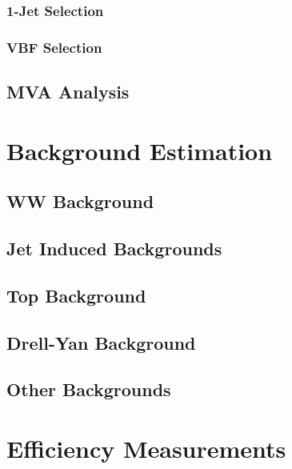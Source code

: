 \documentclass{cmspaper}
\begin{document}
    \subsubsection{1-Jet Selection}
      \label{sec:sel_onejet}
      
    \subsubsection{VBF Selection}
      \label{sec:sel_vbf}
      
  \subsection{MVA Analysis}
    \label{sec:anal_mva}
    
%    

\clearpage
\section{Background Estimation}
    \label{sec:backgrounds}
    
    \label{sec:bkg_intro}
  \subsection{WW Background}
    \label{sec:bkg_ww}
    
  \subsection{Jet Induced Backgrounds}
    \label{sec:bkg_fakes}
    
  \subsection{Top Background}
    \label{sec:bkg_top}
    
  \subsection{Drell-Yan Background}
    \label{sec:bkg_dy}
    
  \subsection{Other Backgrounds}
    \label{sec:bkg_other}
    

\section{Efficiency Measurements}
   \label{sec:efficiency}
\end{document}
